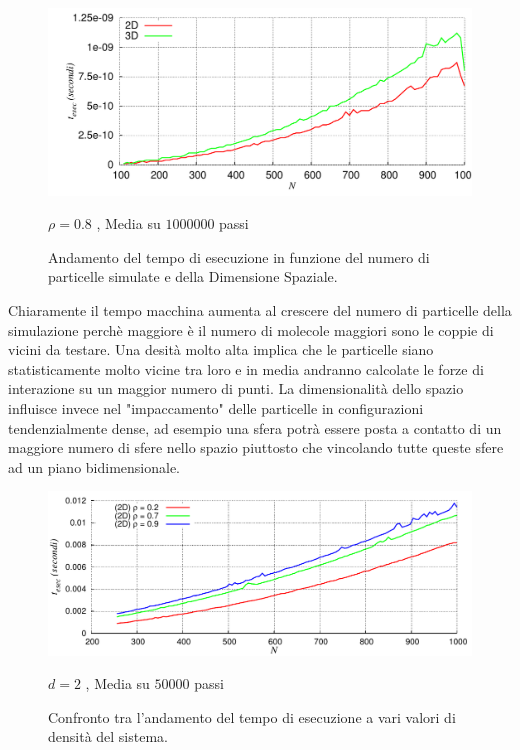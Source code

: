\documentclass[11pt]{article}
\theoremstyle{plain}
\theoremstyle{remark}
\begin{document}
	\begin{figure}
		\centering
		\caption[Sfere Soffici$/$Preliminari\_TempoEsecuzione.cpp]{Andamento del tempo di esecuzione in funzione del numero di particelle simulate e della Dimensione Spaziale.}\label{fig: T_Esec_Confronto_D Soffici}
		\includegraphics[scale=0.5]{Immagini/Soffici/TempoEsecuzione_ConfrontoD}

		\centering  \footnotesize{$\rho=0.8$ , Media su $ 1000000 $ passi}
	\end{figure}
Chiaramente il tempo macchina aumenta al crescere del numero di particelle della simulazione perchè maggiore è il numero di molecole maggiori sono le coppie di vicini da testare.
Una desità molto alta implica che le particelle siano statisticamente molto vicine tra loro e in media andranno calcolate le forze di interazione su un maggior numero di punti.
La dimensionalità dello spazio influisce invece nel "impaccamento" delle particelle in configurazioni tendenzialmente dense, ad esempio una sfera potrà essere posta a contatto di un maggiore numero di sfere nello spazio piuttosto che vincolando tutte queste sfere ad un piano bidimensionale.
	\begin{figure}
		\centering
		\caption[Sfere Soffici$/$Preliminari\_TempoEsecuzione.cpp]{Confronto tra l'andamento del tempo di esecuzione a vari valori di densità del sistema.}\label{fig: T_Esec_Confronto_rho Soffici}
		\includegraphics[scale=0.5]{Immagini/Soffici/TempoEsecuzione2D}

		\centering  \footnotesize{$d=2$ , Media su $ 50000 $ passi}
	\end{figure}
\end{document}
